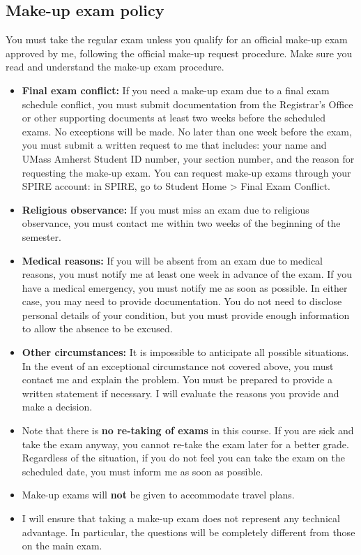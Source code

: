 \documentclass[11pt]{article}
\begin{document}
\subsection*{Make-up exam policy}
\label{sec:org799e3be}
You must take the regular exam unless you qualify for an official make-up exam
approved by me, following the official make-up request procedure. Make sure you
read and understand the make-up exam procedure.

\begin{itemize}
\item \textbf{Final exam conflict:} If you need a make-up exam due to a final exam
schedule conflict, you must submit documentation from the Registrar's Office
or other supporting documents at least two weeks before the scheduled exams.
No exceptions will be made. No later than one week before the exam, you must
submit a written request to me that includes: your name and UMass Amherst
Student ID number, your section number, and the reason for requesting the
make-up exam. You can request make-up exams through your SPIRE account: in
SPIRE, go to Student Home > Final Exam Conflict.

\item \textbf{Religious observance:} If you must miss an exam due to religious observance,
you must contact me within two weeks of the beginning of the semester.

\item \textbf{Medical reasons:} If you will be absent from an exam due to medical reasons,
you must notify me at least one week in advance of the exam. If you have a
medical emergency, you must notify me as soon as possible. In either case,
you may need to provide documentation. You do not need to disclose personal
details of your condition, but you must provide enough information to allow
the absence to be excused.

\item \textbf{Other circumstances:} It is impossible to anticipate all possible
situations. In the event of an exceptional circumstance not covered above,
you must contact me and explain the problem. You must be prepared to provide
a written statement if necessary. I will evaluate the reasons you provide and
make a decision.

\item Note that there is \textbf{no re-taking of exams} in this course. If you are sick
and take the exam anyway, you cannot re-take the exam later for a better
grade. Regardless of the situation, if you do not feel you can take the exam
on the scheduled date, you must inform me as soon as possible.

\item Make-up exams will \textbf{not} be given to accommodate travel plans.

\item I will ensure that taking a make-up exam does not represent any technical
advantage. In particular, the questions will be completely different from
those on the main exam.
\end{itemize}
\end{document}
